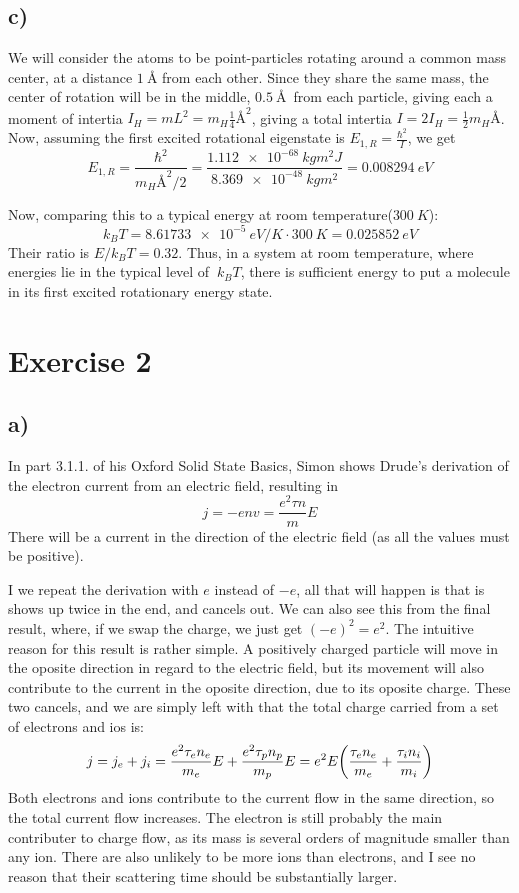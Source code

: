 \documentclass[12p,a4paper]{article}
\begin{document}
\subsection*{c)}
We will consider the atoms to be point-particles rotating around a common mass center, at a distance $\SI{1}{Å}$ from each other. Since they share the same mass, the center of rotation will be in the middle, $\SI{0.5}{Å}$ from each particle, giving each a moment of intertia $I_H = mL^2 = m_H\frac{1}{4}Å^2$, giving a total intertia $I = 2I_H = \frac{1}{2}m_HÅ$. Now, assuming the first excited rotational eigenstate is $E_{1,R} = \frac{\hbar^2}{I}$, we get
\[
    E_{1,R} = \frac{\hbar^2}{m_HÅ^2/2} = \frac{\SI{1.112e-68}{kgm^2J}}{\SI{8.369e-48}{kgm^2}} = \SI{0.008294}{eV}
\]

Now, comparing this to a typical energy at room temperature($\SI{300}{K}$):
\[
    k_BT = \SI{8.61733e-5}{eV/K} \cdot \SI{300}{K} = \SI{0.025852}{eV}
\]
Their ratio is $E/k_BT = 0.32$. Thus, in a system at room temperature, where energies lie in the typical level of $~k_BT$, there is sufficient energy to put a molecule in its first excited rotationary energy state.



\section*{Exercise 2}
\subsection*{a)}
In part 3.1.1. of his Oxford Solid State Basics, Simon shows Drude's derivation of the electron current from an electric field, resulting in
\[
    j = -env = \frac{e^2\tau n}{m} E
\]
There will be a current in the direction of the electric field (as all the values must be positive).

I we repeat the derivation with $e$ instead of $-e$, all that will happen is that is shows up twice in the end, and cancels out.
We can also see this from the final result, where, if we swap the charge, we just get $(-e)^2 = e^2$. The intuitive reason for this result is rather simple. A positively charged particle will move in the oposite direction in regard to the electric field, but its movement will also contribute to the current in the oposite direction, due to its oposite charge. These two cancels, and we are simply left with that the total charge carried from a set of electrons and ios is:
\[
    j = j_e + j_i = \frac{e^2\tau_e n_e}{m_e}E + \frac{e^2\tau_p n_p}{m_p}E = e^2E \qty(\frac{\tau_e n_e}{m_e} + \frac{\tau_i n_i}{m_i})
\]
Both electrons and ions contribute to the current flow in the same direction, so the total current flow increases. The electron is still probably the main contributer to charge flow, as its mass is several orders of magnitude smaller than any ion. There are also unlikely to be more ions than electrons, and I see no reason that their scattering time should be substantially larger.
\end{document}
